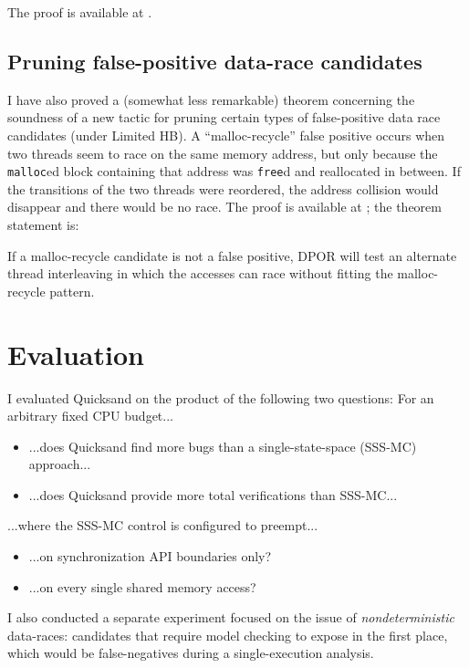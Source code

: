 The proof is available at \cite{quicksand-soundness}.

\subsection{Pruning false-positive data-race candidates}
I have also proved a (somewhat less remarkable) theorem concerning the soundness of a new tactic for pruning certain types of false-positive data race candidates (under Limited HB).
A ``malloc-recycle'' false positive occurs when two threads seem to race on the same memory address, but only because the {\tt malloc}ed block containing that address was {\tt free}d and reallocated in between.
If the transitions of the two threads were reordered, the address collision would disappear and there would be no race.
The proof is available at \cite{quicksand-soundness}; the theorem statement is:

\begin{theorem}
	If a malloc-recycle candidate is not a false positive,
	DPOR will test an alternate thread interleaving in which the
	accesses can race without fitting the malloc-recycle pattern.
\end{theorem}


\section{Evaluation}

I evaluated Quicksand on the product of the following two questions: For an arbitrary fixed CPU budget...

\begin{itemize}
	\item ...does Quicksand find more bugs than a single-state-space (SSS-MC) approach...
	\item ...does Quicksand provide more total verifications than SSS-MC...
\end{itemize}
...where the SSS-MC control is configured to preempt...
\begin{itemize}
	\item ...on synchronization API boundaries only?
	\item ...on every single shared memory access?
\end{itemize}

I also conducted a separate experiment focused on the issue of {\em nondeterministic} data-races:
candidates that require model checking to expose in the first place, which would be
false-negatives during a single-execution analysis.

